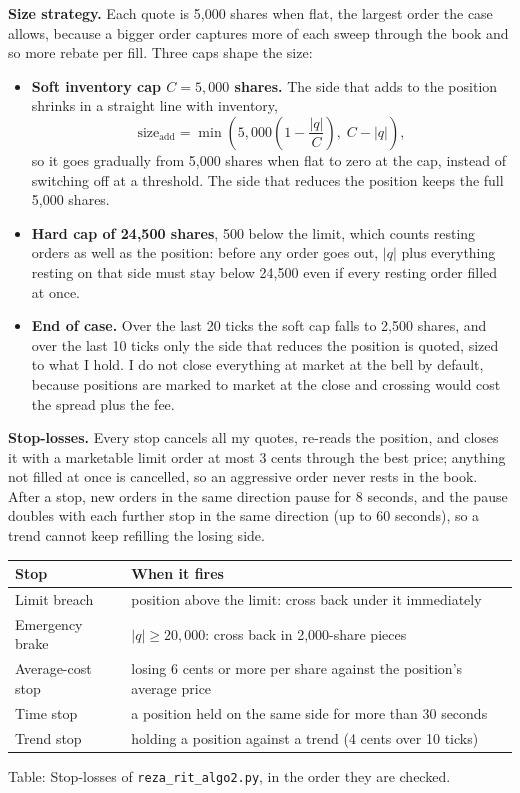 \documentclass{article}
\begin{document}
\textbf{Size strategy.} Each quote is 5,000 shares when flat, the largest order the case allows,
because a bigger order captures more of each sweep through the book and so more rebate per fill.
Three caps shape the size:
\begin{itemize}
  \item \textbf{Soft inventory cap $C = 5{,}000$ shares.} The side that adds to the position shrinks in
        a straight line with inventory,
        \begin{equation}
          \text{size}_{\text{add}} = \min\!\left(5{,}000\left(1 - \frac{|q|}{C}\right),\; C - |q|\right),
        \end{equation}
        so it goes gradually from 5,000 shares when flat to zero at the cap, instead of switching off at
        a threshold. The side that reduces the position keeps the full 5,000 shares.
  \item \textbf{Hard cap of 24,500 shares}, 500 below the limit, which counts resting orders as well as
        the position: before any order goes out, $|q|$ plus everything resting on that side must stay
        below 24,500 even if every resting order filled at once.
  \item \textbf{End of case.} Over the last 20 ticks the soft cap falls to 2,500 shares, and over the last
        10 ticks only the side that reduces the position is quoted, sized to what I hold. I do not close
        everything at market at the bell by default, because positions are marked to market at the
        close and crossing would cost the spread plus the fee.
\end{itemize}

\textbf{Stop-losses.} Every stop cancels all my quotes, re-reads the position, and closes it with a
marketable limit order at most 3 cents through the best price; anything not filled at once is cancelled,
so an aggressive order never rests in the book. After a stop, new orders in the same direction pause
for 8 seconds, and the pause doubles with each further stop in the same direction (up to 60 seconds), so
a trend cannot keep refilling the losing side.

\begin{center}
\begin{tabular}{|l|p{8.2cm}|}
\hline
Stop & When it fires \\
\hline
Limit breach      & position above the limit: cross back under it immediately \\
Emergency brake   & $|q| \ge 20{,}000$: cross back in 2,000-share pieces \\
Average-cost stop & losing 6 cents or more per share against the position's average price \\
Time stop         & a position held on the same side for more than 30 seconds \\
Trend stop        & holding a position against a trend (4 cents over 10 ticks) \\
\hline
\end{tabular}

\smallskip
Table: Stop-losses of \texttt{reza\_rit\_algo2.py}, in the order they are checked.
\end{center}
\end{document}
